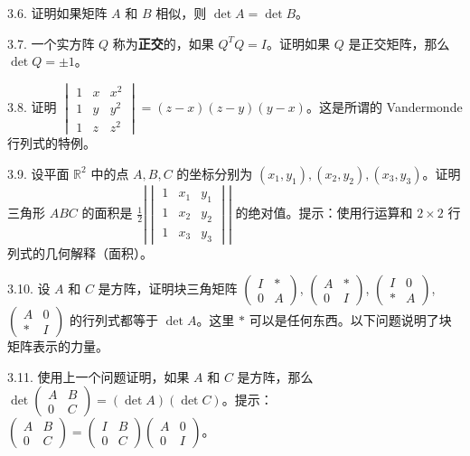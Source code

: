 3.6. 证明如果矩阵 $A$ 和 $B$ 相似，则 $\det A = \det B$。

3.7. 一个实方阵 $Q$ 称为\textbf{正交}的，如果 $Q^T Q = I$。证明如果 $Q$ 是正交矩阵，那么 $\det Q = \pm 1$。

3.8. 证明 $\begin{vmatrix} 1 & x & x^2 \\ 1 & y & y^2 \\ 1 & z & z^2 \end{vmatrix} = (z-x)(z-y)(y-x)$。这是所谓的 Vandermonde 行列式的特例。

3.9. 设平面 $\mathbb{R}^2$ 中的点 $A, B, C$ 的坐标分别为 $(x_1, y_1), (x_2, y_2), (x_3, y_3)$。证明三角形 $ABC$ 的面积是 $\frac{1}{2} \left| \begin{vmatrix} 1 & x_1 & y_1 \\ 1 & x_2 & y_2 \\ 1 & x_3 & y_3 \end{vmatrix} \right|$ 的绝对值。提示：使用行运算和 $2 \times 2$ 行列式的几何解释（面积）。

3.10. 设 $A$ 和 $C$ 是方阵，证明块三角矩阵 $\begin{pmatrix} I & * \\ 0 & A \end{pmatrix}$, $\begin{pmatrix} A & * \\ 0 & I \end{pmatrix}$, $\begin{pmatrix} I & 0 \\ * & A \end{pmatrix}$, $\begin{pmatrix} A & 0 \\ * & I \end{pmatrix}$ 的行列式都等于 $\det A$。这里 $*$ 可以是任何东西。以下问题说明了块矩阵表示的力量。

3.11. 使用上一个问题证明，如果 $A$ 和 $C$ 是方阵，那么 $\det \begin{pmatrix} A & B \\ 0 & C \end{pmatrix} = (\det A)(\det C)$。提示：$\begin{pmatrix} A & B \\ 0 & C \end{pmatrix} = \begin{pmatrix} I & B \\ 0 & C \end{pmatrix} \begin{pmatrix} A & 0 \\ 0 & I \end{pmatrix}$。

